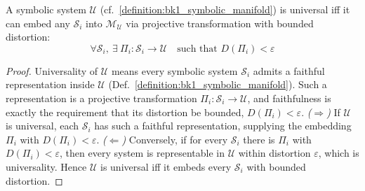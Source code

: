 \begin{corollary}
\label{corollary:bk8_universality_condition}
A symbolic system $\mathscr{U}$ (cf.~\ref{definition:bk1_symbolic_manifold}) is universal iff it can embed any $\mathscr{S}_i$ into $\mathcal{M}_\mathscr{U}$ via projective transformation with bounded distortion:
\[
\forall \mathscr{S}_i, \ \exists \ \Pi_i : \mathscr{S}_i \to \mathscr{U} \quad \text{such that } D(\Pi_i) < \varepsilon
\]
\end{corollary}
\begin{proof}
\label{proof:bk8_universality_condition}
\leavevmode
Universality of $\mathscr{U}$ means every symbolic system $\mathscr{S}_i$ admits a faithful representation inside $\mathscr{U}$ (Def.~\ref{definition:bk1_symbolic_manifold}). Such a representation is a projective transformation $\Pi_i:\mathscr{S}_i\to\mathscr{U}$, and faithfulness is exactly the requirement that its distortion be bounded, $D(\Pi_i)<\varepsilon$. \emph{($\Rightarrow$)} If $\mathscr{U}$ is universal, each $\mathscr{S}_i$ has such a faithful representation, supplying the embedding $\Pi_i$ with $D(\Pi_i)<\varepsilon$. \emph{($\Leftarrow$)} Conversely, if for every $\mathscr{S}_i$ there is $\Pi_i$ with $D(\Pi_i)<\varepsilon$, then every system is representable in $\mathscr{U}$ within distortion $\varepsilon$, which is universality. Hence $\mathscr{U}$ is universal iff it embeds every $\mathscr{S}_i$ with bounded distortion.
\end{proof}

